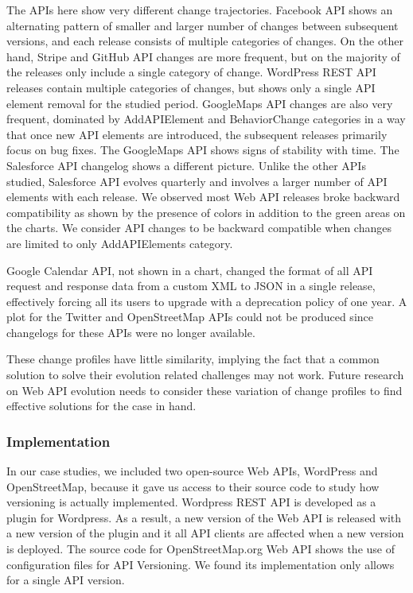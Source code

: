 The APIs here show very different change trajectories. Facebook API shows an alternating pattern of smaller and larger number of changes between subsequent versions, and each release consists of multiple categories of changes. On the other hand, Stripe and GitHub API changes are more frequent, but on the majority of the releases only include a single category of change. WordPress REST API releases contain multiple categories of changes, but shows only a single API element removal for the studied period. GoogleMaps API changes are also very frequent, dominated by AddAPIElement and BehaviorChange categories in a way that once new API elements are introduced, the subsequent releases primarily focus on bug fixes. The GoogleMaps API shows signs of stability with time. The Salesforce API changelog shows a different picture. Unlike the other APIs studied, Salesforce API evolves quarterly and involves a larger number of API elements with each release. We observed most Web API releases broke backward compatibility as shown by the presence of colors in addition to the green areas on the charts. We consider API changes to be backward compatible when changes are limited to only AddAPIElements category.

Google Calendar API, not shown in a chart, changed the format of all API request and response data from a custom XML to JSON in a single release, effectively forcing all its users to upgrade with a deprecation policy of one year. A plot for the Twitter and OpenStreetMap APIs could not be produced since changelogs for these APIs were no longer available.

These change profiles have little similarity, implying the fact that a common solution to solve their evolution related challenges may not work. Future research on Web API evolution needs to consider these variation of change profiles to find effective solutions for the case in hand.

\subsubsection{Implementation} %
\label{ssub:implementation}

In our case studies, we included two open-source Web APIs, WordPress and OpenStreetMap, because it gave us access to  their source code to study how versioning is actually implemented. Wordpress REST API is developed as a plugin for Wordpress. As a result, a new version of the Web API is released with a new version of the plugin and it all API clients are affected when a new version is deployed. The source code for OpenStreetMap.org Web API shows the use of configuration files for API Versioning. We found its implementation only allows for a single API version.

